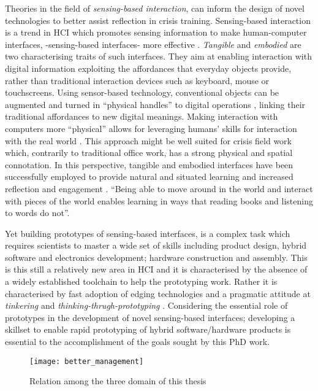 Theories in the field of \emph{sensing-based interaction}, can inform
the design of novel technologies to better assist reflection in crisis
training. Sensing-based interaction is a trend in HCI which promotes
sensing information to make human-computer interfaces, -sensing-based
interfaces- more effective \autocite{Zhai:2005jm}. \emph{Tangible} and
\emph{embodied} \autocite{Dourish:2001vc} are two characterising traits
of such interfaces. They aim at enabling interaction with digital
information exploiting the affordances that everyday objects provide,
rather than traditional interaction devices such as keyboard, mouse or
touchscreens. Using sensor-based technology, conventional objects can be
augmented and turned in ``physical handles'' to digital operations
\autocite{Ishii:1997ur}, linking their traditional affordances to new
digital meanings. Making interaction with computers more ``physical''
allows for leveraging humans' skills for interaction with the real world
\autocite{Shaer:2009fx}. This approach might be well suited for crisis
field work which, contrarily to traditional office work, has a strong
physical and spatial connotation. In this perspective, tangible and
embodied interfaces have been successfully employed to provide natural
\autocite{Terrenghi:2005gq} and situated \autocite{Klemmer:2006ez}
learning and increased reflection and engagement
\autocite{Rogers:2006te}. ``Being able to move around in the world and
interact with pieces of the world enables learning in ways that reading
books and listening to words do not''. \autocite{Klemmer:2006ez}

Yet building prototypes of sensing-based interfaces, is a complex task
which requires scientists to master a wide set of skills including
product design, hybrid software and electronics development; hardware
construction and assembly. This is this still a relatively new area in
HCI and it is characterised by the absence of a widely established
toolchain to help the prototyping work. Rather it is characterised by
fast adoption of edging technologies and a pragmatic attitude at
\emph{tinkering} and \emph{thinking-thrugh-prototyping}
\autocite{Klemmer:2006ez}. Considering the essential role of prototypes
in the development of novel sensing-based interfaces; developing a
skillset to enable rapid prototyping of hybrid software/hardware
products is essential to the accomplishment of the goals sought by this
PhD work.

\begin{figure}[tbh]
    \centering
    \texttt{[image: better\_management]}
    \caption{Relation among the three domain of this thesis}
    \label{fig:topic_relation}
\end{figure}

